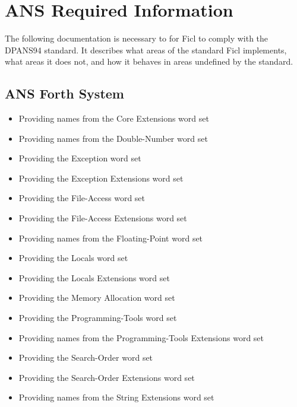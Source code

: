 \chapter{ANS Required Information}
The following documentation is necessary to for Ficl to comply with the
DPANS94 standard. It describes what areas of the standard Ficl
implements, what areas it does not, and how it behaves in areas
undefined by the standard.


\section{ANS Forth System}
\begin{itemize}[noitemsep]
	\item Providing names from the Core Extensions word set
	\item Providing names from the Double-Number word set
	\item Providing the Exception word set
	\item Providing the Exception Extensions word set
	\item Providing the File-Access word set
	\item Providing the File-Access Extensions word set
	\item Providing names from the Floating-Point word set
	\item Providing the Locals word set
	\item Providing the Locals Extensions word set
	\item Providing the Memory Allocation word set
	\item Providing the Programming-Tools word set
	\item Providing names from the Programming-Tools Extensions word set
	\item Providing the Search-Order word set
	\item Providing the Search-Order Extensions word set
	\item Providing names from the String Extensions word set
\end{itemize}


